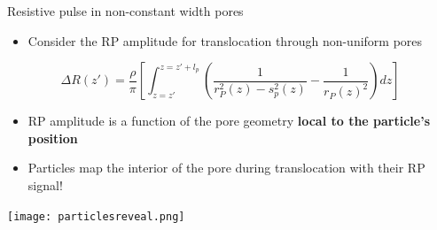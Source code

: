 \begin{frame}[c]{Resistive pulse in non-constant width pores}
	\begin{itemize}
		\item Consider the RP amplitude for translocation through non-uniform pores
	\end{itemize}
	$$ \Delta R\left(z'\right)=\frac{\rho}{\pi}\left[\int_{z=z'}^{z=z'+l_{p}}\left(\frac{1}{r_{P}^{2}\left(z\right)-s_{p}^{2}\left(z\right)}-\frac{1}{r_{P}\left(z\right)^{2}}\right)dz\right] $$
	\begin{itemize}
		\item RP amplitude is a function of the pore geometry \textbf{local to the particle's position}
		\item Particles map the interior of the pore during translocation with their RP signal!
	\end{itemize}
	
	{\centering
		\texttt{[image: particlesreveal.png]} \\
		\par
	}

	
\end{frame}



